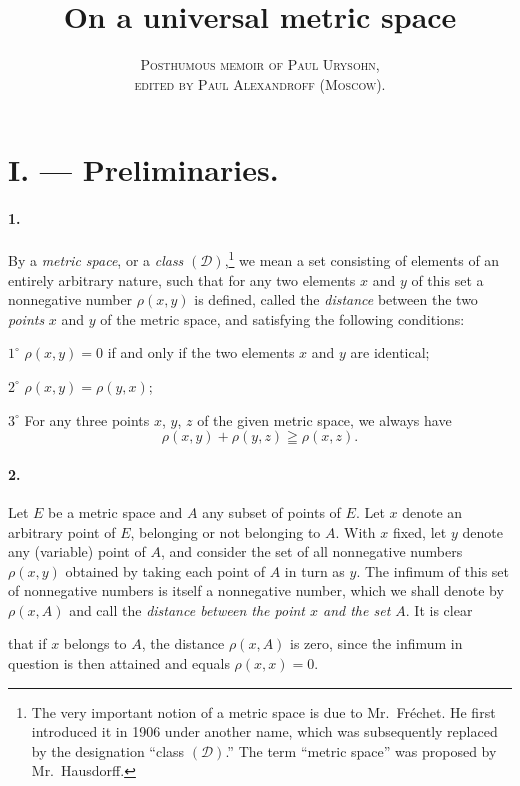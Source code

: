 \documentclass[a4paper,12pt]{amsart}
\newcommand{\srcpage}[1]{} %
\begin{document}
\title{On a universal metric space}
\author{\textsc{Posthumous memoir of Paul Urysohn,}\\
\textsc{edited by Paul Alexandroff (Moscow).}}
\maketitle
\srcpage{43}
\section*{I. --- Preliminaries.}
\paragraph{1.}
By a \textit{metric space}, or a \textit{class} $(\mathscr{D})$,\footnote{The very important notion of a metric space is due to Mr.~Fréchet. He first introduced it in 1906 under another name, which was subsequently replaced by the designation ``class $(\mathscr{D})$.'' The term ``metric space'' was proposed by Mr.~Hausdorff.}
we mean a set consisting of elements of an entirely arbitrary nature, such that for any two elements $x$ and $y$ of this set a nonnegative number $\rho(x,y)$ is defined, called the \textit{distance} between the two \textit{points} $x$ and $y$ of the metric space, and satisfying the following conditions:

$1^\circ$ $\rho(x,y)=0$ if and only if the two elements $x$ and $y$ are identical;

$2^\circ$ $\rho(x,y)=\rho(y,x)$;

$3^\circ$ For any three points $x$, $y$, $z$ of the given metric space, we always have
\[
\rho(x,y)+\rho(y,z)\geqq\rho(x,z).
\]
\paragraph{2.}
Let $E$ be a metric space and $A$ any subset of points of $E$. Let $x$ denote an arbitrary point of $E$, belonging or not belonging to $A$. With $x$ fixed, let $y$ denote any (variable) point of $A$, and consider the set of all nonnegative numbers $\rho(x,y)$ obtained by taking each point of $A$ in turn as $y$. The infimum of this set of nonnegative numbers is itself a nonnegative number, which we shall denote by $\rho(x,A)$ and call the \textit{distance between the point $x$ and the set $A$}. It is clear
\srcpage{44}
that if $x$ belongs to $A$, the distance $\rho(x,A)$ is zero, since the infimum in question is then attained and equals $\rho(x,x)=0$.
\end{document}
